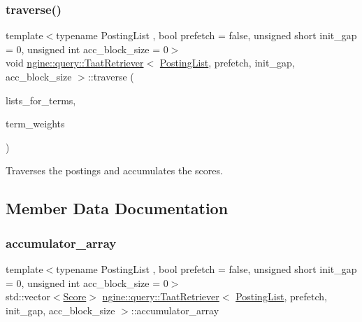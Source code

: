 \subsubsection{\texorpdfstring{traverse()}{traverse()}}
{\footnotesize\ttfamily template$<$typename Posting\+List , bool prefetch = false, unsigned short init\+\_\+gap = 0, unsigned int acc\+\_\+block\+\_\+size = 0$>$ \\
void \hyperlink{classngine_1_1query_1_1TaatRetriever}{ngine\+::query\+::\+Taat\+Retriever}$<$ \hyperlink{classngine_1_1PostingList}{Posting\+List}, prefetch, init\+\_\+gap, acc\+\_\+block\+\_\+size $>$\+::traverse (\begin{DoxyParamCaption}\item[{const std\+::vector$<$ \hyperlink{classngine_1_1PostingList}{Posting\+List} $>$ \&}]{lists\+\_\+for\+\_\+terms,  }\item[{const std\+::vector$<$ \hyperlink{structngine_1_1Score}{Score} $>$ \&}]{term\+\_\+weights }\end{DoxyParamCaption})\hspace{0.3cm}{\ttfamily [inline]}}



Traverses the postings and accumulates the scores. 



\subsection{Member Data Documentation}
\mbox{\label{classngine_1_1query_1_1TaatRetriever_afbc8b5606edd1c8709791437e2a95d45}} 
\subsubsection{\texorpdfstring{accumulator\+\_\+array}{accumulator\_array}}
{\footnotesize\ttfamily template$<$typename Posting\+List , bool prefetch = false, unsigned short init\+\_\+gap = 0, unsigned int acc\+\_\+block\+\_\+size = 0$>$ \\
std\+::vector$<$\hyperlink{structngine_1_1Score}{Score}$>$ \hyperlink{classngine_1_1query_1_1TaatRetriever}{ngine\+::query\+::\+Taat\+Retriever}$<$ \hyperlink{classngine_1_1PostingList}{Posting\+List}, prefetch, init\+\_\+gap, acc\+\_\+block\+\_\+size $>$\+::accumulator\+\_\+array\hspace{0.3cm}{\ttfamily [protected]}}



